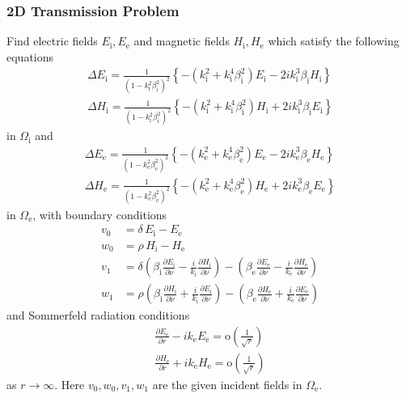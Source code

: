 \subsubsection{2D Transmission Problem}

Find electric fields $E_\text{i}, E_\text{e}$ and magnetic fields $H_\text{i}, H_\text{e}$ which satisfy the following equations
\begin{equation}
\begin{split}
  \Delta E_\text{i} =\frac{1}{(1-k_\text{i}^2\beta_\text{i}^2)^2}\left\{-\left(k_\text{i}^2 + k_\text{i}^4\beta_\text{i}^2\right)E_\text{i} - 2 i k_\text{i}^3\beta_\text{i} H_\text{i}\right\} \\
  \Delta H_\text{i} = \frac{1}{(1-k_\text{i}^2\beta_\text{i}^2)^2}\left\{-\left(k_\text{i}^2 + k_\text{i}^4\beta_\text{i}^2\right)H_\text{i} + 2 i k_\text{i}^3\beta_\text{i} E_\text{i}\right\} 
\end{split}
\end{equation}
in $\Omega_\text{i}$ and
\begin{equation}
\begin{split}
  \Delta E_\text{e} =\frac{1}{(1-k_\text{e}^2\beta_\text{e}^2)^2}\left\{-\left(k_\text{e}^2 + k_\text{e}^4\beta_\text{e}^2\right)E_\text{e} - 2 i k_\text{e}^3\beta_\text{e} H_\text{e}\right\} \\
  \Delta H_\text{e} = \frac{1}{(1-k_\text{e}^2\beta_\text{e}^2)^2}\left\{-\left(k_\text{e}^2 + k_\text{e}^4\beta_\text{e}^2\right)H_\text{e} + 2 i k_\text{e}^3\beta_\text{e} E_\text{e}\right\} 
\end{split}
\end{equation}
in $\Omega_\text{e}$, with boundary conditions
\begin{equation}
\begin{split}
  v_0 &= \delta\,E_\text{i} - E_\text{e} \\
  w_0 &= \rho\,H_\text{i} - H_\text{e}   \\
  v_1 &= \delta\left(\beta_\text{i}\frac{\partial E_\text{i}}{\partial\nu} - \frac{i}{k_\text{i}}\frac{\partial H_\text{i}}{\partial\nu}\right) -\left(\beta_\text{e}\frac{\partial E_\text{e}}{\partial\nu} - \frac{i}{k_\text{e}}\frac{\partial H_\text{e}}{\partial\nu}\right) \\
  w_1 &= \rho\left(\beta_\text{i}\frac{\partial H_\text{i}}{\partial\nu} + \frac{i}{k_\text{i}}\frac{\partial E_\text{i}}{\partial\nu}\right) -\left(\beta_\text{e}\frac{\partial H_\text{e}}{\partial\nu} + \frac{i}{k_\text{e}}\frac{\partial E_\text{e}}{\partial\nu}\right) 
\end{split}
\end{equation}
and Sommerfeld radiation conditions
\begin{align}
  \frac{\partial E_\text{e}}{\partial r}-ik_\text{e}E_\text{e} = \text{o}\left(\frac{1}{\sqrt{r}}\right) \\
  \frac{\partial H_\text{e}}{\partial r}+ik_\text{e}H_\text{e} = \text{o}\left(\frac{1}{\sqrt{r}}\right) 
\end{align}
as $r\to\infty$. Here $v_0, w_0, v_1, w_1$ are the given incident fields in $\Omega_\text{e}$.

